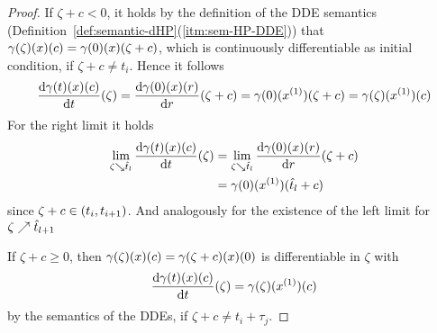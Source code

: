 \begin{proof}
        If $\zeta+c<0$, it holds by the definition of the DDE semantics (Definition~\ref{def:semantic-dHP}(\ref{itm:sem-HP-DDE})) that $\gamma(\zeta)(x)(c)=\gamma(0)(x)(\zeta+c)$, which is continuously differentiable as initial condition, if $\zeta+c\neq t_i$. Hence it follows
        \begin{equation*}
            \DD{\trajectory(t)(x)(c)}{t}(\zeta)=\DD{\trajectory(0)(x)(\past)}{\past}(\zeta+c)=\trajectory(0)(\D{x})(\zeta+c)=\trajectory(\zeta)(\D{x})(c)
        \end{equation*}
        For the right limit it holds
        \begin{align*}
            \lim_{\zeta\downto\hat{t}_l} \DD{\trajectory(t)(x)(c)}{t}(\zeta)
                & = \lim_{\zeta\downto \hat{t}_l} \DD{\trajectory(0)(x)(\past)}{\past}(\zeta+c)\\
                & 
                = \trajectory(0)(\D{x})(\hat{t}_l+c)
        \end{align*}
        since $\zeta+c\in(t_i,t_{i+1})$.
        And analogously for the existence of the left limit for $\zeta\nearrow\hat{t}_{l+1}$

        If $\zeta+c\geq 0$, then $\gamma(\zeta)(x)(c)=\gamma(\zeta+c)(x)(0)$ is differentiable in $\zeta$ with
        \begin{equation*}
            \DD{\trajectory(t)(x)(c)}{t}(\zeta) = \trajectory(\zeta)(\D{x})(c)
        \end{equation*}
        by the semantics of the DDEs, if $\zeta+c\neq t_i+\tau_j$.




\end{proof}
